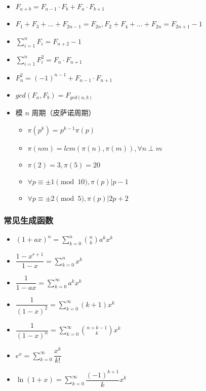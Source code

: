 \documentclass[]{article}
\providecommand{\tightlist}{%
  \setlength{\itemsep}{0pt}\setlength{\parskip}{0pt}}
\begin{document}
\begin{itemize}
\tightlist
\item
  \(F_{a+b}=F_{a-1} \cdot F_b+F_a \cdot F_{b+1}\)
\item
  \(F_1+F_3+\dots +F_{2n-1} = F_{2n},F_2 + F_4 + \dots + F_{2n} = F_{2n + 1} - 1\)
\item
  \(\sum_{i=1}^n F_i = F_{n+2} - 1\)
\item
  \(\sum_{i=1}^n F_i^2 = F_n \cdot F_{n+1}\)
\item
  \(F_n^2=(-1)^{n-1} + F_{n-1} \cdot F_{n+1}\)
\item
  \(gcd(F_a, F_b)=F_{gcd(a, b)}\)
\item
  模 \(n\) 周期（皮萨诺周期）

  \begin{itemize}
  \tightlist
  \item
    \(\pi(p^k) = p^{k-1} \pi(p)\)
  \item
    \(\pi(nm) = lcm(\pi(n), \pi(m)), \forall n \perp m\)
  \item
    \(\pi(2)=3, \pi(5)=20\)
  \item
    \(\forall p \equiv \pm 1\pmod {10}, \pi(p)|p-1\)
  \item
    \(\forall p \equiv \pm 2\pmod {5}, \pi(p)|2p+2\)
  \end{itemize}
\end{itemize}

\hypertarget{ux5e38ux89c1ux751fux6210ux51fdux6570}{%
\subsubsection{常见生成函数}\label{ux5e38ux89c1ux751fux6210ux51fdux6570}}

\begin{itemize}
\tightlist
\item
  \((1+ax)^n=\sum_{k=0}^n \binom {n}{k} a^kx^k\)
\item
  \(\dfrac{1-x^{r+1}}{1-x}=\sum_{k=0}^nx^k\)
\item
  \(\dfrac1{1-ax}=\sum_{k=0}^{\infty}a^kx^k\)
\item
  \(\dfrac 1{(1-x)^2}=\sum_{k=0}^{\infty}(k+1)x^k\)
\item
  \(\dfrac1{(1-x)^n}=\sum_{k=0}^{\infty} \binom{n+k-1}{k}x^k\)
\item
  \(e^x=\sum_{k=0}^{\infty}\dfrac{x^k}{k!}\)
\item
  \(\ln(1+x)=\sum_{k=0}^{\infty}\dfrac{(-1)^{k+1}}{k}x^k\)
\end{itemize}
\end{document}
